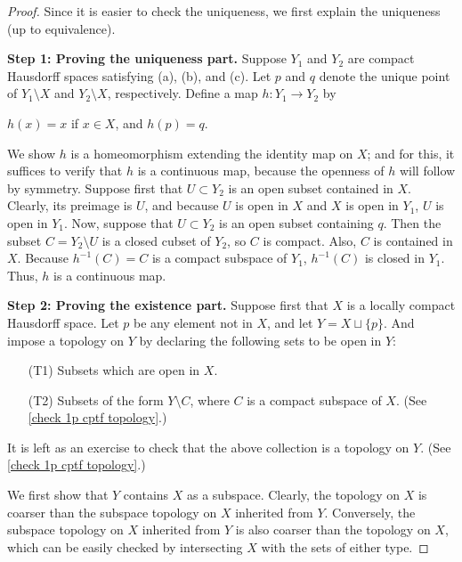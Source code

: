 \begin{proof}
    Since it is easier to check the uniqueness, we first explain the uniqueness (up to equivalence).

    \textbf{Step 1: Proving the uniqueness part.}\newline\noindent
    Suppose $Y_1$ and $Y_2$ are compact Hausdorff spaces satisfying (a), (b), and (c).
    Let $p$ and $q$ denote the unique point of $Y_1\setminus X$ and $Y_2\setminus X$, respectively.
    Define a map $h: Y_1\rightarrow Y_2$ by
    \begin{center}
        $h(x)=x$ if $x\in X$, and $h(p)=q$.
    \end{center}
    We show $h$ is a homeomorphism extending the identity map on $X$; and for this, it suffices to verify that $h$ is a continuous map, because the openness of $h$ will follow by symmetry.
    Suppose first that $U\subset Y_2$ is an open subset contained in $X$.
    Clearly, its preimage is $U$, and because $U$ is open in $X$ and $X$ is open in $Y_1$, $U$ is open in $Y_1$.
    Now, suppose that $U\subset Y_2$ is an open subset containing $q$.
    Then the subset $C=Y_2\setminus U$ is a closed cubset of $Y_2$, so $C$ is compact.
    Also, $C$ is contained in $X$.
    Because $h^{-1}(C)=C$ is a compact subspace of $Y_1$, $h^{-1}(C)$ is closed in $Y_1$.
    Thus, $h$ is a continuous map.

    \textbf{Step 2: Proving the existence part.}\newline\noindent
    Suppose first that $X$ is a locally compact Hausdorff space.
    Let $p$ be any element not in $X$, and let $Y=X\sqcup\{p\}$.
    And impose a topology on $Y$ by declaring the following sets to be open in $Y$:
    \begin{enumerate}
        \item[(T1)]
        {
            Subsets which are open in $X$.
        }
        \item[(T2)]
        {
            Subsets of the form $Y\setminus C$, where $C$ is a compact subspace of $X$. (See \cref{check 1p cptf topology}.)
        }
    \end{enumerate}
    It is left as an exercise to check that the above collection is a topology on $Y$. (See \cref{check 1p cptf topology}.)

    We first show that $Y$ contains $X$ as a subspace.
    Clearly, the topology on $X$ is coarser than the subspace topology on $X$ inherited from $Y$.
    Conversely, the subspace topology on $X$ inherited from $Y$ is also coarser than the topology on $X$, which can be easily checked by intersecting $X$ with the sets of either type.


\end{proof}
